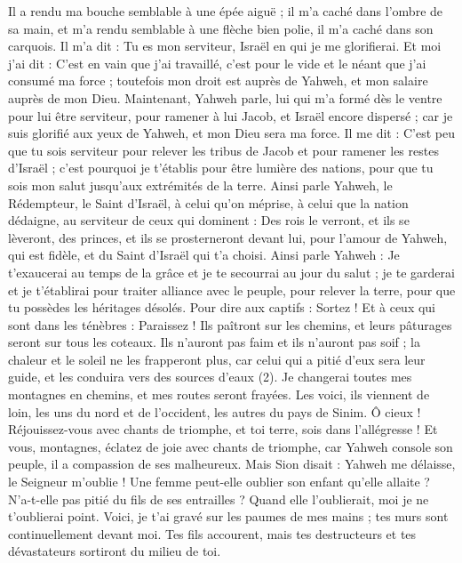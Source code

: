 \begin{multicols}{2}
{Il a rendu ma bouche semblable à une épée aiguë ; il m'a caché dans l'ombre de sa main, et m'a rendu semblable à une flèche bien polie, il m'a caché dans son carquois.
Il m'a dit : Tu es mon serviteur, Israël en qui je me glorifierai.
Et moi j'ai dit : C’est en vain que j’ai travaillé, c’est pour le vide et le néant que j’ai consumé ma force ; toutefois mon droit est auprès de Yahweh, et mon salaire auprès de mon Dieu.
Maintenant, Yahweh parle, lui qui m'a formé dès le ventre pour lui être serviteur, pour ramener à lui Jacob, et Israël encore dispersé ; car je suis glorifié aux yeux de Yahweh, et mon Dieu sera ma force.
Il me dit : C'est peu que tu sois serviteur pour relever les tribus de Jacob et pour ramener les restes d'Israël ; c'est pourquoi je t’établis pour être lumière des nations, pour que tu sois mon salut jusqu’aux extrémités de la terre.
Ainsi parle Yahweh, le Rédempteur, le Saint d'Israël, à celui qu’on méprise, à celui que la nation dédaigne, au serviteur de ceux qui dominent : Des rois le verront, et ils se lèveront, des princes, et ils se prosterneront devant lui, pour l'amour de Yahweh, qui est fidèle, et du Saint d'Israël qui t'a choisi.
Ainsi parle Yahweh : Je t’exaucerai au temps de la grâce et je te secourrai au jour du salut ; je te garderai et je t’établirai pour traiter alliance avec le peuple, pour relever la terre, pour que tu possèdes les héritages désolés.
Pour dire aux captifs : Sortez ! Et à ceux qui sont dans les ténèbres : Paraissez ! Ils paîtront sur les chemins, et leurs pâturages seront sur tous les coteaux.
Ils n'auront pas faim et ils n'auront pas soif ; la chaleur et le soleil ne les frapperont plus, car celui qui a pitié d'eux sera leur guide, et les conduira vers des sources d'eaux (2).
Je changerai toutes mes montagnes en chemins, et mes routes seront frayées.
Les voici, ils viennent de loin, les uns du nord et de l’occident, les autres du pays de Sinim.
Ô cieux ! Réjouissez-vous avec chants de triomphe, et toi terre, sois dans l’allégresse ! Et vous, montagnes, éclatez de joie avec chants de triomphe, car Yahweh console son peuple, il a compassion de ses malheureux.
Mais Sion disait : Yahweh me délaisse, le Seigneur m’oublie !
Une femme peut-elle oublier son enfant qu'elle allaite ? N’a-t-elle pas pitié du fils de ses entrailles ? Quand elle l’oublierait, moi je ne t’oublierai point.
Voici, je t'ai gravé sur les paumes de mes mains ; tes murs sont continuellement devant moi.
Tes fils accourent, mais tes destructeurs et tes dévastateurs sortiront du milieu de toi.
}
\end{multicols}
